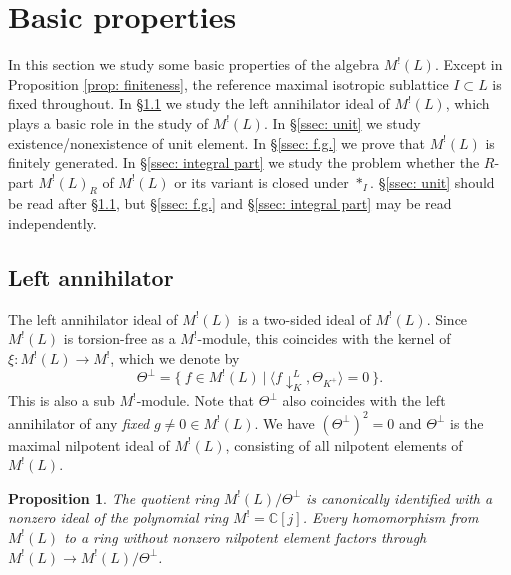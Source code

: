 \documentclass[12pt]{amsart}
\numberwithin{equation}{section}
\newtheorem{proposition}[theorem]{Proposition}
\theoremstyle{definition}
\theoremstyle{remark}
\newcommand{\C}{\mathbb{C}}
\newcommand{\pushLK}{\downarrow^{L}_{K}}
\newcommand{\ThetaK}{\Theta_{K^{+}}}
\newcommand{\ML}{M^{!}(L)}
\newcommand{\MLR}{M^{!}(L)_{R}}
\begin{document}

\section{Basic properties}\label{sec: first property}

In this section we study some basic properties of the algebra ${\ML}$. 
Except in Proposition \ref{prop: finiteness}, 
the reference maximal isotropic sublattice $I\subset L$ is fixed throughout. 
In \S \ref{ssec: annihilator} we study the left annihilator ideal of ${\ML}$, 
which plays a basic role in the study of ${\ML}$. 
In \S \ref{ssec: unit} we study existence/nonexistence of unit element. 
In \S \ref{ssec: f.g.} we prove that ${\ML}$ is finitely generated. 
In \S \ref{ssec: integral part} we study the problem 
whether the $R$-part ${\MLR}$ of ${\ML}$ or its variant is closed under $\ast_{I}$. 
\S \ref{ssec: unit} should be read after \S \ref{ssec: annihilator}, 
but \S \ref{ssec: f.g.} and \S \ref{ssec: integral part} may be read independently. 



\subsection{Left annihilator}\label{ssec: annihilator} 

The left annihilator ideal of ${\ML}$ 
is a two-sided ideal of ${\ML}$. 
Since ${\ML}$ is torsion-free as a $M^{!}$-module, 
this coincides with the kernel of $\xi \colon {\ML}\to M^{!}$, 
which we denote by 
\begin{equation*}
\Theta^{\perp} = 
\{ \: f\in{\ML} \: | \: \langle f{\pushLK}, {\ThetaK} \rangle = 0 \: \}. 
\end{equation*}
This is also a sub $M^!$-module. 
Note that $\Theta^{\perp}$ also coincides with the left annihilator of any \textit{fixed} $g\ne0 \in {\ML}$. 
We have 
$(\Theta^{\perp})^{2}=0$ 
and $\Theta^{\perp}$ is the maximal nilpotent ideal of ${\ML}$, 
consisting of all nilpotent elements of ${\ML}$. 


\begin{proposition}\label{prop: theta kernel basic}
The quotient ring ${\ML}/\Theta^{\perp}$ is canonically identified with 
a nonzero ideal of the polynomial ring $M^{!}={\C}[j]$.  
Every homomorphism from ${\ML}$ to a ring without nonzero nilpotent element 
factors through ${\ML}\to {\ML}/\Theta^{\perp}$. 
\end{proposition}
\end{document}
